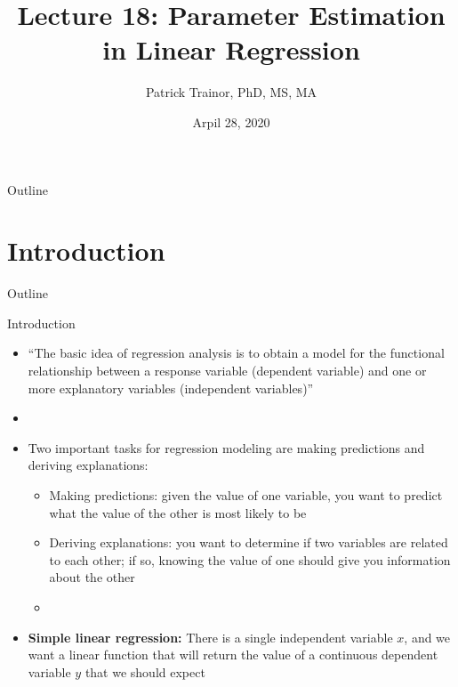 \documentclass[xcolor=dvipsnames]{beamer}
\title[Lecture 18]{Lecture 18: Parameter Estimation in Linear Regression}
\author[Patrick Trainor]{Patrick Trainor, PhD, MS, MA}
\institute[NMSU]{New Mexico State University}
\date{Arpil 28, 2020}
\begin{document}
\begin{frame}
\maketitle
\end{frame}

\begin{frame}{Outline}
\tableofcontents[hideallsubsections]
\end{frame}

\section{Introduction}
\begin{frame}{Outline}
\tableofcontents[currentsection,subsectionstyle=show/shaded/hide]
\end{frame}

\begin{frame}{Introduction}
	\begin{itemize}
		\item ``The basic idea of regression analysis is to obtain a model for the functional relationship between a response variable (dependent variable) and one or more explanatory variables (independent variables)'' \pause
		\item[]
		\item Two important tasks for regression modeling are making predictions and deriving explanations: \pause
		\begin{itemize}
			\item Making predictions: given the value of one variable, you want to predict what the value of the other is most likely to be \pause
			\item Deriving explanations: you want to determine if two variables are related to each other; if so, knowing the value of one should give you information about the other \pause
			\item[]
		\end{itemize}
		\item \textbf{Simple linear regression:} There is a single independent variable $x$, and we want a linear function that will return the value of a continuous dependent variable $y$ that we should expect
	\end{itemize}
\end{frame}
\end{document}

